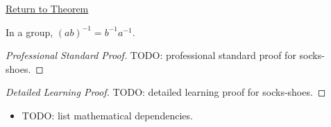 \newpage
{}
\label{prf:socks-shoes}

\begin{remark*}[Return]
\hyperref[prop:socks-shoes]{Return to Theorem}
\end{remark*}

\begin{proposition*}
In a group, $(ab)^{-1}=b^{-1}a^{-1}$.
\end{proposition*}

\begin{proof}[Professional Standard Proof]
\LRAProofBodyStart
TODO: professional standard proof for socks-shoes.
\end{proof}

\begin{proof}[Detailed Learning Proof]
\LRAProofBodyStart
TODO: detailed learning proof for socks-shoes.
\end{proof}

\begin{remark*}
\end{remark*}

\begin{dependencies}
\begin{itemize}
  \item TODO: list mathematical dependencies.
\end{itemize}
\end{dependencies}

\clearpage
